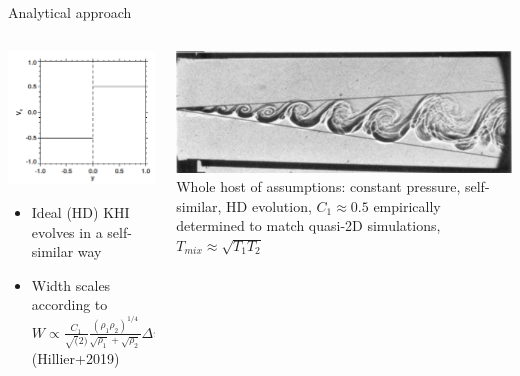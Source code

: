 \documentclass[10pt,aspectratio=169,usenames,dvipsnames]{beamer}
\begin{document}
\begin{frame}{Analytical approach}
\begin{columns}
\begin{column}{0.4\textwidth}
\includegraphics[width=0.95\linewidth]{2023Dundee/Figures/khiinterface.png}
\begin{itemize}
    \item Ideal (HD) KHI evolves in a self-similar way
    \item Width scales according to $W\propto \frac{C_1}{\sqrt(2)} \frac{\left( \rho_1 \rho_2 \right)^{1/4}}{\sqrt{\rho_1}+\sqrt{\rho_2}} \Delta v_t$ (Hillier+2019)
\end{itemize}
\end{column}
\begin{column}{0.6\textwidth}
\includegraphics[width=0.95\linewidth]{2023Dundee/Figures/selfsimilar.png} \\
Whole host of assumptions: constant pressure, self-similar, HD evolution, $C_1 \approx 0.5$ empirically determined to match quasi-2D simulations, $T_{mix} \approx \sqrt{T_1 T_2}$
\end{column}
\end{columns}
\end{frame}
\end{document}
